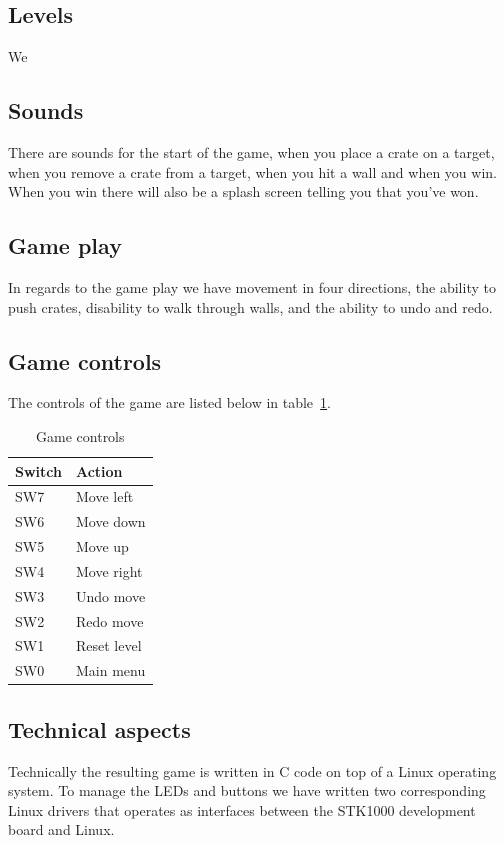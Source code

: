 \documentclass[a4paper,11pt]{article}
\begin{document}
\subsection{Levels}
We 

\subsection{Sounds}There are sounds for the start of the game, when you place a crate on a target, when you remove a crate from a target, when you hit a wall and when you win. When you win there will also be a splash screen telling you that you've won. 

\subsection{Game play}
In regards to the game play we have movement in four directions, the ability to push crates, disability to walk through walls, and the ability to undo and redo. 

\subsection{Game controls}
The controls of the game are listed below in table~\ref{tab:gamecontrols}. 
\begin{table}[H]
\centering
\begin{tabular}{|l|l|}
\hline \textbf{Switch} & \textbf{Action} \\ 
\hline SW7 & Move left \\ 
\hline SW6 & Move down \\ 
\hline SW5 & Move up \\ 
\hline SW4 & Move right \\ 
\hline SW3 & Undo move \\ 
\hline SW2 & Redo move \\ 
\hline SW1 & Reset level \\ 
\hline SW0 & Main menu \\
\hline 
\end{tabular}
\caption{Game controls} 
\label{tab:gamecontrols}
\end{table}

\subsection{Technical aspects}Technically the resulting game is written in C code on top of a Linux operating system. To manage the LEDs and buttons we have written two corresponding Linux drivers that operates as interfaces between the STK1000 development board and Linux. 
\end{document}
